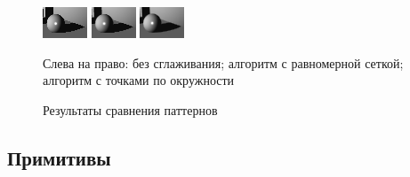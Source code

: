 \documentclass[12pt, a4paper, utf8]{article}
\begin{document}
\begin{figure}[H]
\centering
\includegraphics[scale=5]{imgs/aa_no.png}
\includegraphics[scale=5]{imgs/aa_std.png}
\includegraphics[scale=5]{imgs/aa_my.png}
\caption{Результаты сравнения паттернов}\label{fig:result_compare_pattern_subpixel}
Слева на право: без сглаживания; алгоритм с равномерной сеткой; алгоритм с точками по окружности
\end{figure}

\subsection{Примитивы}
\end{document}
